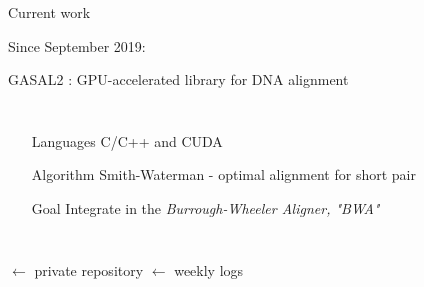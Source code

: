 
\begin{frame}{Current work}

	\begin{center}
		Since September 2019:
		
		GASAL2 : GPU-accelerated library for DNA alignment
	
	\begin{columns}
		\begin{itemize}
			\item[Languages] C/C++ and CUDA
			\item[Algorithm] Smith-Waterman - optimal alignment for short pair
			\item[Goal] Integrate in the \emph{Burrough-Wheeler Aligner, "BWA"}
		\end{itemize}	
	\end{columns}

	\bigskip
	\end{center}
	 $\leftarrow$ private repository
	 $\leftarrow$ weekly logs
	
\end{frame}